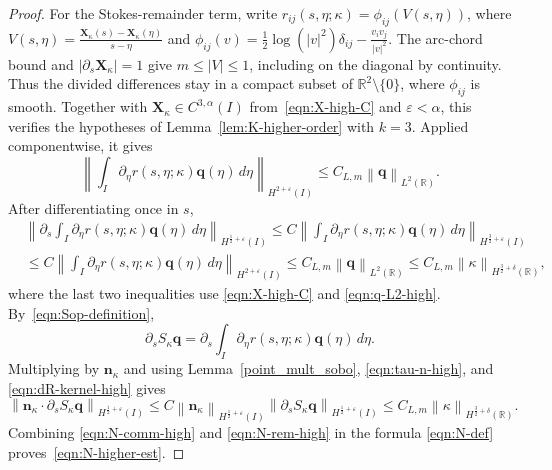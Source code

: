 \documentclass[11pt,reqno]{amsart}
\theoremstyle{plain}
\theoremstyle{definition}
\numberwithin{equation}{section}
\newcommand{\p}{\partial}
\newcommand{\bm}[1]{\boldsymbol{#1}}
\newcommand{\abs}[1]{\left\lvert #1 \right\rvert}
\newcommand{\norm}[1]{\left\lVert #1 \right\rVert}
\newcommand{\R}{\mathbb{R}}
\newcommand{\nk}{\bm n_\kappa}
\newcommand{\xk}{\bm X_\kappa}
\newcommand{\ci}[1]{C^{#1}(I)}
\newcommand{\hi}[1]{H^{#1}(I)}
\newcommand{\hr}[1]{H^{#1}(\R)}
\begin{document}
\begin{proof}
For the Stokes-remainder term, write
$r_{ij}(s,\eta;\kappa)=\phi_{ij}(V(s,\eta))$, where
$V(s,\eta)=\frac{\xk(s)-\xk(\eta)}{s-\eta}$ and
$\phi_{ij}(v)=\frac{1}{2}\log(\abs{v}^2)\delta_{ij}-\frac{v_i v_j}{|v|^2}$.
The arc-chord bound and $|\p_s\xk|=1$ give $m\le|V|\le1$, including
on the diagonal by continuity. Thus the divided differences stay in a
compact subset of $\R^2\setminus\{0\}$, where $\phi_{ij}$ is smooth.
Together with $\xk\in\ci{3,\alpha}$ from~\eqref{eqn:X-high-C} and
$\varepsilon<\alpha$, this verifies the hypotheses of
Lemma~\ref{lem:K-higher-order} with $k=3$. Applied componentwise, it gives
\begin{equation}\label{eqn:R-kernel-high}
    \norm{\int_I \p_\eta r(s,\eta;\kappa)\bm q(\eta)\,d\eta}_{\hi{2+\varepsilon}}
    \le C_{L,m}
        \norm{\bm q}_{L^2(\R)} .
\end{equation}
After differentiating once in $s$,
\begin{equation}\label{eqn:dR-kernel-high}
\begin{aligned}
    &\norm{\p_s\int_I \p_\eta r(s,\eta;\kappa)\bm q(\eta)\,d\eta}_{\hi{\frac{1}{2}+\varepsilon}} \le C\norm{\int_I
    \p_\eta r(s,\eta;\kappa)\bm q(\eta)\,d\eta}_{\hi{\frac{3}{2}+\varepsilon}}  \\
    &\le C\norm{\int_I \p_\eta r(s,\eta;\kappa)\bm q(\eta)\,d\eta}_{\hi{2+\varepsilon}} \le C_{L,m}
    \norm{\bm q}_{L^2(\R)} \le C_{L,m} \norm{\kappa}_{\hr{\frac{3}{2}+\delta}} ,
\end{aligned}
\end{equation}
where the last two inequalities use \eqref{eqn:X-high-C} and
\eqref{eqn:q-L2-high}. By~\eqref{eqn:Sop-definition},
\begin{equation}
    \p_s S_\kappa\bm q
    =
    \p_s\int_I\p_\eta r(s,\eta;\kappa)\bm q(\eta)\,d\eta .
\end{equation}
Multiplying by $\nk$ and using Lemma~\ref{point_mult_sobo},
\eqref{eqn:tau-n-high}, and \eqref{eqn:dR-kernel-high} gives
\begin{equation}\label{eqn:N-rem-high}
    \norm{\nk\cdot\p_s S_\kappa\bm q}_{\hi{\frac{1}{2}+\varepsilon}} \le C\norm{\nk}_{\hi{\frac{1}{2}+\varepsilon}}
    \norm{\p_s S_\kappa\bm q}_{\hi{\frac{1}{2}+\varepsilon}} \le C_{L,m} \norm{\kappa}_{\hr{\frac{3}{2}+\delta}} .
\end{equation}
Combining \eqref{eqn:N-comm-high} and \eqref{eqn:N-rem-high} in the formula
\eqref{eqn:N-def} proves~\eqref{eqn:N-higher-est}.
\end{proof}
\end{document}
